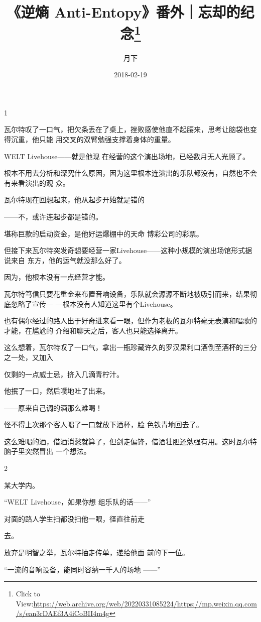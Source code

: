 \documentclass{article}
\title{《逆熵 Anti-Entopy》番外｜忘却的纪念\footnote{Click to View:\url{https://web.archive.org/web/20220331085224/https://mp.weixin.qq.com/s/ean3rDAEf3A4iCoBII4m4g}}}
\author{月下}
\date{2018-02-19}
\begin{document}

\maketitle


\Large


﻿1 

瓦尔特叹了一口气，把欠条丢在了桌上，挫败感使他直不起腰来，思考让脑袋也变得沉重，他只能
用交叉的双臂勉强支撑着身体的重量。 

WELT Livehouse——就是他现
在经营的这个演出场地，已经数月无人光顾了。 

根本不用去分析和深究什么原因，因为这里根本连演出的乐队都没有，自然也不会有来看演出的观
众。 

瓦尔特现在回想起来，他从起步开始就是错的

\newpage
——不，或许连起步都是错的。 

堪称巨款的启动资金，是他好运爆棚中的天命
博彩公司的彩票。 

但接下来瓦尔特突发奇想要经营一家Livehouse——这种小规模的演出场馆形式据说来自
东方，他的运气就没那么好了。 


因为，他根本没有一点经营才能。 

瓦尔特笃信只要花重金来布置音响设备，乐队就会源源不断地被吸引而来，结果彻底忽略了宣传—
—根本没有人知道这里有个Livehouse。 

也有偶尔经过的路人出于好奇进来看一眼，但作为老板的瓦尔特毫无表演和唱歌的才能，在尴尬的
介绍和聊天之后，客人也只能选择离开。 

这么想着，瓦尔特叹了一口气，拿出一瓶珍藏许久的罗汉果利口酒倒至酒杯的三分之一处，又加入

\newpage
仅剩的一点威士忌，挤入几滴青柠汁。 


他抿了一口，然后噗地吐了出来。 


——原来自己调的酒那么难喝！ 

怪不得上次那个客人喝了一口就放下酒杯，脸
色铁青地回去了。 

这么难喝的酒，借酒消愁就算了，但剑走偏锋，借酒壮胆还勉强有用。这时瓦尔特脑子里突然冒出
一个想法。 


2 


某大学内。 

“WELT Livehouse，如果你想
组乐队的话——” 

对面的路人学生扫都没扫他一眼，径直往前走

\newpage
去。 

放弃是明智之举，瓦尔特抽走传单，递给他面
前的下一位。 

“一流的音响设备，能同时容纳一千人的场地
——” 
\end{document}
